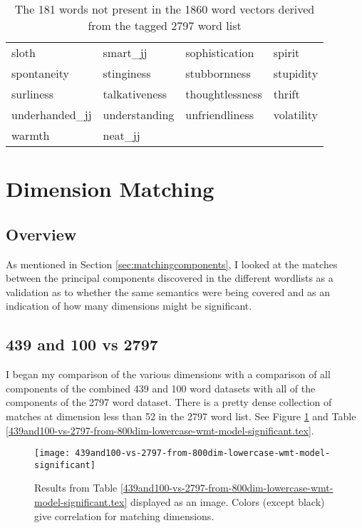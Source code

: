 \documentclass[eric_thesis.tex]{subfiles}
\begin{document}
\begin{table}[tbp]
\begin{tabular}{| llll |}
        sloth & smart\_jj & sophistication & spirit \\
        spontaneity & stinginess & stubbornness & stupidity \\
        surliness & talkativeness & thoughtlessness & thrift \\
        underhanded\_jj & understanding & unfriendliness & volatility \\
        warmth & neat\_jj &  &  \\
        \hline
    \end{tabular}
    \caption{The 181 words not present in the 1860 word vectors derived from
    the tagged 2797 word list}
    \label{tab:additionalwordsin2797combined}

\end{table}



\section{Dimension Matching}
\subsection{Overview}

As mentioned in Section \ref{sec:matchingcomponents}, I looked at the
matches between the principal components discovered in the different
wordlists as a validation as to whether the same semantics were being
covered and as an indication of how many dimensions might be
significant.

\subsection{439 and 100 vs 2797}

I began my comparison of the various dimensions with a comparison of all 
components of the combined 439 and 100 word datasets with all of the components
of the 2797 word dataset. There is a pretty dense collection of matches at
dimension less than 52 in the 2797 word list. See Figure 
\ref{fig:439and100vs2797} and Table
\ref{439and100-vs-2797-from-800dim-lowercase-wmt-model-significant.tex}. 



\begin{figure}[tbp]
    \texttt{[image: 439and100-vs-2797-from-800dim-lowercase-wmt-model-significant]}
    \caption{Results from Table 
    \ref{439and100-vs-2797-from-800dim-lowercase-wmt-model-significant.tex} 
    displayed as an image. Colors (except black) give correlation for matching 
    dimensions.}
    \label{fig:439and100vs2797}
\end{figure}
\end{document}
